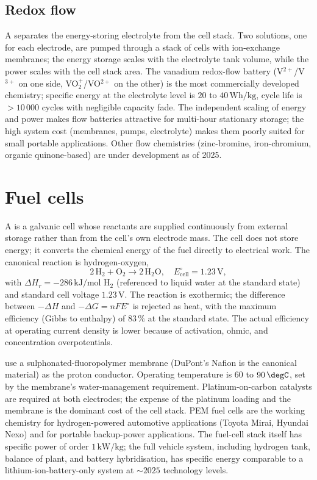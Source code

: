 \subsection{Redox flow}

A  separates the energy-storing electrolyte from
the cell stack. Two solutions, one for each electrode, are pumped
through a stack of cells with ion-exchange membranes; the energy
storage scales with the electrolyte tank volume, while the power
scales with the cell stack area. The vanadium redox-flow battery
(V$^{2+}$/V$^{3+}$ on one side, VO$_2^+$/VO$^{2+}$ on the other) is
the most commercially developed chemistry; specific energy at the
electrolyte level is $20$ to $40\,\text{Wh}/\text{kg}$, cycle life is
$> 10\,000$ cycles with negligible capacity fade. The independent
scaling of energy and power makes flow batteries attractive for
multi-hour stationary storage; the high system cost (membranes,
pumps, electrolyte) makes them poorly suited for small portable
applications. Other flow chemistries (zinc-bromine, iron-chromium,
organic quinone-based) are under development as of 2025.

\section{Fuel cells}

A  is a galvanic cell whose reactants are supplied
continuously from external storage rather than from the cell's own
electrode mass. The cell does not store energy; it converts the
chemical energy of the fuel directly to electrical work. The
canonical reaction is hydrogen-oxygen,
\[
2\,\text{H}_2 + \text{O}_2 \to 2\,\text{H}_2\text{O}, \quad
E^\circ_{\text{cell}} = 1.23\,\text{V},
\]
with $\Delta H_r = -286\,\text{kJ}/\text{mol H}_2$ (referenced to
liquid water at the standard state) and standard cell voltage
$1.23\,\text{V}$. The reaction is exothermic; the difference between
$-\Delta H$ and $-\Delta G = nFE^\circ$ is rejected as heat, with the
maximum efficiency (Gibbs to enthalpy) of $83\,\%$ at the standard
state. The actual efficiency at operating current density is lower
because of activation, ohmic, and concentration overpotentials.

 use a
sulphonated-fluoropolymer membrane (DuPont's Nafion is the canonical
material) as the proton conductor. Operating temperature is $60$ to
$90\,\degC$, set by the membrane's water-management requirement.
Platinum-on-carbon catalysts are required at both electrodes; the
expense of the platinum loading and the membrane is the dominant cost
of the cell stack. PEM fuel cells are the working chemistry for
hydrogen-powered automotive applications (Toyota Mirai, Hyundai
Nexo) and for portable backup-power applications. The fuel-cell
stack itself has specific power of order $1\,\text{kW}/\text{kg}$;
the full vehicle system, including hydrogen tank, balance of plant,
and battery hybridisation, has specific energy comparable to a
lithium-ion-battery-only system at $\sim 2025$ technology levels.

